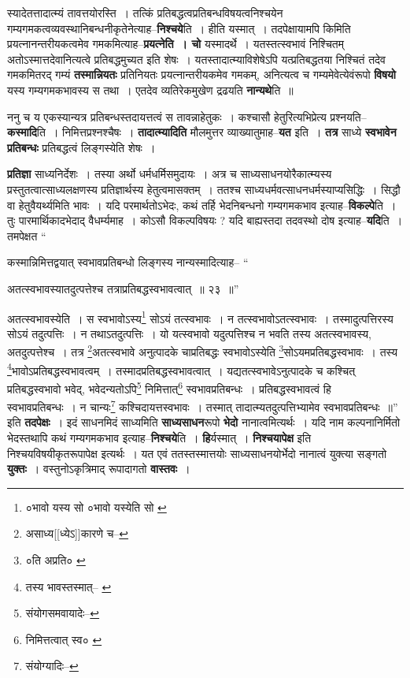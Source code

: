 \documentclass[article,12pt,a4paper]{memoir}
\begin{document}
	  \endgroup
	

	  \pstart स्यादेतत्तादात्म्यं तावत्तयोरस्ति । तत्किं प्रतिबद्धत्वप्रतिबन्धविषयत्वनिश्चयेन गम्यगमकत्वव्यवस्थानिबन्धनीकृतेनेत्याह--\textbf{निश्चये}ति । हीति यस्मात् । तदपेक्षायामपि किमिति प्रयत्नानन्तरीयकत्वमेव गमकमित्याह--\textbf{प्रयत्नेति । चो} यस्मादर्थे । यतस्तत्स्वभावं निश्चितम् अतोऽस्मात्तदेवानित्यत्वे प्रतिबद्धमुच्यत इति शेषः । यतस्तादात्म्याविशेषेऽपि यत्प्रतिबद्धतया निश्चितं तदेव गमकमितरद् गम्यं \textbf{तस्मान्नियतः} प्रतिनियतः प्रयत्नान्तरीयकमेव गमकम्, अनित्यत्व च गम्यमेवेत्येवंरूपो \textbf{विषयो} यस्य गम्यगमकभावस्य स तथा । एतदेव व्यतिरेकमुखेण द्रढयति \textbf{नान्यथे}ति ॥
	\pend
      

	  \pstart ननु च य एकस्यान्यत्र प्रतिबन्धस्तदायत्तत्वं स तावन्नाहेतुकः । कश्चासौ हेतुरित्यभिप्रेत्य प्रश्नयति--\textbf{कस्मादि}ति । निमित्तप्रश्नश्चैषः । \textbf{तादात्म्यादिति} मौलमुत्तर व्याख्यातुमाह--\textbf{यत} इति । \textbf{तत्र} साध्ये \textbf{स्वभावेन प्रतिबन्धः} प्रतिबद्धत्वं लिङ्गस्येति शेषः ।
	\pend
      

	  \pstart \textbf{प्रतिज्ञा} साध्यनिर्देशः । तस्या अर्थो धर्मधर्मिसमुदायः । अत्र च साध्यसाधनयोरैकात्म्यस्य प्रस्तुतत्वात्साध्यलक्षणस्य प्रतिज्ञार्थस्य हेतुत्वमासक्तम् । ततश्च साध्यधर्मवत्साधनधर्मस्याप्यसिद्धिः । सिद्धौ वा हेतुवैयर्थ्यमिति भावः । यदि परमार्थतोऽभेदः, कथं तर्हि भेदनिबन्धनो गम्यगमकभाव इत्याह--\textbf{विकल्पे}ति । तुः पारमार्थिकादभेदाद् वैधर्म्यमाह । कोऽसौ विकल्पविषयः ? यदि बाह्यस्तदा तदवस्थो दोष इत्याह--\textbf{यदि}ति । तमपेक्षत  \leavevmode{} “
	  
	कस्मान्निमित्तद्वयात् स्वभावप्रतिबन्धो लिङ्गस्य नान्यस्मादित्याह-- “
	  
	अतत्स्वभावस्यातदुत्पत्तेश्च तत्राप्रतिबद्धस्वभावत्वात् ॥ २३ ॥” 
	  
	अतत्स्वभावस्येति । स स्वभावोऽस्य\footnote{०भावो यस्य सो \cite{dp-msD} ०भावो यस्येति सो \cite{dp-msC}} सोऽयं तत्स्वभावः । न तत्स्वभावोऽतत्स्वभावः । तस्मादुत्पत्तिरस्य सोऽयं तदुत्पत्तिः । न तथाऽतदुत्पत्तिः । यो यत्स्वभावो यदुत्पत्तिश्च न भवति तस्य अतत्स्वभावस्य, अतदुत्पत्तेश्च । तत्र \footnote{असाध्य[[ध्येऽ]]कारणे च--\cite{dp-msD-n}}अतत्स्वभावे अनुत्पादके चाप्रतिबद्धः स्वभावोऽस्येति \footnote{०ति अप्रति० \cite{dp-msD}}सोऽयमप्रतिबद्धस्वभावः । तस्य \footnote{तस्य भावस्तस्मात्--\cite{dp-msD} \cite{dp-msC}}भावोऽप्रतिबद्धस्वभावत्वम् । तस्मादप्रतिबद्धस्वभावत्वात् । यद्यतत्स्वभावेऽनुत्पादके च कश्चित् प्रतिबद्धस्वभावो भवेद्, भवेदन्यतोऽपि\footnote{संयोगसमवायादेः--\cite{dp-msD-n}} निमित्तात्\footnote{निमित्तत्वात् स्व० \cite{dp-msC}} स्वभावप्रतिबन्धः । प्रतिबद्धस्वभावत्वं हि स्वभावप्रतिबन्धः । न चान्यः\footnote{संयोग्यादिः--\cite{dp-msD-n}} कश्चिदायत्तस्वभावः । तस्मात् तादात्म्यतदुत्पत्तिभ्यामेव स्वभावप्रतिबन्धः ॥” इति \textbf{तदपेक्षः} । इदं साधनमिदं साध्यमिति \textbf{साध्यसाधन}रूपो \textbf{भेदो} नानात्वमित्यर्थः । यदि नाम कल्पनानिर्मितो भेदस्तथापि कथं गम्यगमकभाव इत्याह--\textbf{निश्चये}ति । \textbf{हि}र्यस्मात् । \textbf{निश्चयापेक्ष} इति निश्चयविषयीकृतरूपापेक्ष इत्यर्थः । यत एवं ततस्तस्मात्तयोः साध्यसाधनयोर्भेदो नानात्वं युक्त्या सङ्गतो \textbf{युक्तः} । वस्तुनोऽकृत्रिमाद् रूपादागतो \textbf{वास्तवः} ।
	\pend
      
\end{document}
